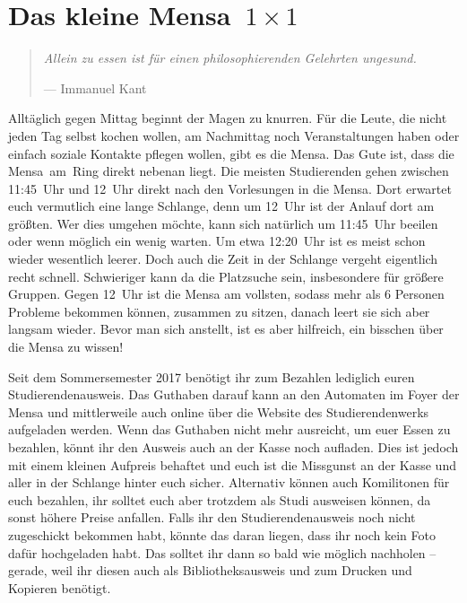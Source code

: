 \section[Das kleine Mensa~1~×~1]{\boldmath Das kleine Mensa~${1 \times 1}$}
\begin{multicols}{2}
\begin{quote}
	\textit{Allein zu essen ist für einen philosophierenden Gelehrten ungesund.}
	
	\hfill--- Immanuel Kant
\end{quote}

Alltäglich gegen Mittag beginnt der Magen zu knurren.
Für die Leute, die nicht jeden Tag selbst kochen wollen, am Nachmittag noch Veranstaltungen haben oder einfach soziale Kontakte pflegen wollen, gibt es die Mensa.
Das Gute ist, dass die Mensa~am~Ring direkt nebenan liegt.
Die meisten Studierenden gehen zwischen 11:45~Uhr und 12~Uhr direkt nach den Vorlesungen in die Mensa.
Dort erwartet euch vermutlich eine lange Schlange, denn um 12~Uhr ist der Anlauf dort am größten. Wer dies umgehen möchte, kann sich natürlich um 11:45~Uhr beeilen oder wenn möglich ein wenig warten. Um etwa 12:20~Uhr ist es meist schon wieder wesentlich leerer.
Doch auch die Zeit in der Schlange vergeht eigentlich recht schnell. Schwieriger kann da die Platzsuche sein, insbesondere für größere Gruppen. Gegen 12~Uhr ist die Mensa am vollsten, sodass mehr als 6 Personen Probleme bekommen können, zusammen zu sitzen, danach leert sie sich aber langsam wieder. 
Bevor man sich anstellt, ist es aber hilfreich, ein bisschen über die Mensa zu wissen!

Seit dem Sommersemester 2017 benötigt ihr zum Bezahlen lediglich euren Studierendenausweis.
Das Guthaben darauf kann an den Automaten im Foyer der Mensa und mittlerweile auch online über die Website des Studierendenwerks aufgeladen werden.
Wenn das Guthaben nicht mehr ausreicht, um euer Essen zu bezahlen, könnt ihr den Ausweis auch an der Kasse noch aufladen. 
Dies ist jedoch mit einem kleinen Aufpreis behaftet und euch ist die Missgunst an der Kasse und aller in der Schlange hinter euch sicher.
Alternativ können auch Komilitonen für euch bezahlen, ihr solltet euch aber trotzdem als Studi ausweisen können, da sonst höhere Preise anfallen.
Falls ihr den Studierendenausweis noch nicht zugeschickt bekommen habt, könnte das daran liegen, dass ihr noch kein Foto dafür hochgeladen habt.
Das solltet ihr dann so bald wie möglich nachholen -- gerade, weil ihr diesen auch als Bibliotheksausweis und zum Drucken und Kopieren benötigt.


\end{multicols}
